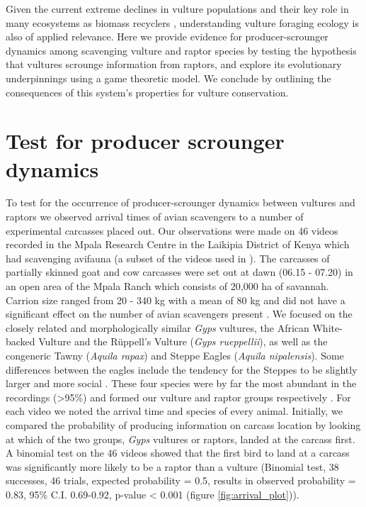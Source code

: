 \indent Given the current extreme declines in vulture populations \citep{ogada2012dropping,green2004diclofenac} and their key role in many ecosystems as biomass recyclers \citep{ogada2012effects,sekercioglu2006increasing}, understanding vulture foraging ecology is also of applied relevance. Here we provide evidence for producer-scrounger dynamics among scavenging vulture and raptor species by testing the hypothesis that vultures scrounge information from raptors, and explore its evolutionary underpinnings using a game theoretic model. We conclude by outlining the consequences of this system's properties for vulture conservation.


\section{\uppercase{T}est for producer scrounger dynamics}

To test for the occurrence of producer-scrounger dynamics between vultures and raptors we observed arrival times of avian scavengers to a number of experimental carcasses placed out. Our observations were made on 46 videos recorded in the Mpala Research Centre in the Laikipia District of Kenya which had scavenging avifauna (a subset of the videos used in \cite{ogada2012effects}). The carcasses of partially skinned goat and cow carcasses were set out at dawn (06.15 - 07.20) in an open area of the Mpala Ranch which consists of 20,000 ha of savannah. Carrion size ranged from 20 - 340 kg with a mean of 80 kg and did not have a significant effect on the number of avian scavengers present \citep{ogada2012effects}. We focused on the closely related and morphologically similar \textit{Gyps} vultures, the African White-backed Vulture and the R{\"u}ppell's Vulture (\textit {Gyps rueppellii}), as well as the congeneric Tawny (\textit {Aquila rapax}) and Steppe Eagles (\textit {Aquila nipalensis}). Some differences between the eagles include the tendency for the Steppes to be slightly larger and more social \citep{clark1992taxonomy}. These four species were by far the most abundant in the recordings (>95\%) and formed our vulture and raptor groups respectively \citep{ogada2012effects}. 
For each video we noted the arrival time and species of every animal. Initially, we compared the probability of producing information on carcass location by looking at which of the two groups, \textit{Gyps} vultures or raptors, landed at the carcass first. A binomial test on the 46 videos showed that the first bird to land at a carcass was significantly more likely to be a raptor than a vulture (Binomial test, 38 successes, 46 trials, expected probability = 0.5, results in observed probability = 0.83, 95\% C.I. 0.69-0.92, p-value < 0.001 (figure \ref{fig:arrival_plot})).

